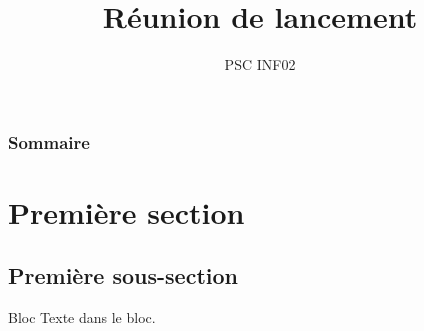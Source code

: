 \documentclass{beamer}
\title{Réunion de lancement}
\subtitle{PSC INF02}
\author{}
\institute{École polytechnique}
\date{}
\begin{document}
\begin{frame}
\titlepage

\end{frame}		
\begin{frame}
\frametitle{Sommaire}
			\tableofcontents[pausesections]
\end{frame}



\section{Première section}
\subsection{Première sous-section}

\begin{frame}

\begin{block}{Bloc}
Texte dans le bloc.
\end{block}

\end{frame}


	
\end{document}
